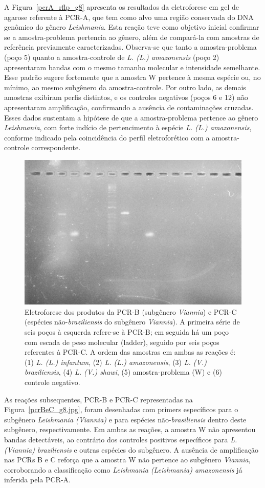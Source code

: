 A Figura~\ref{pcrA_rflp_g8} apresenta os resultados da eletroforese em gel de agarose referente à PCR-A, que tem como alvo uma região conservada do DNA genômico do gênero
 \textit{Leishmania}. Esta reação teve como objetivo inicial confirmar se a amostra-problema pertencia ao gênero, além de compará-la com amostras de referência previamente 
 caracterizadas. Observa-se que tanto a amostra-problema (poço 5) quanto a amostra-controle de \textit{L. (L.) amazonensis} (poço 2) apresentaram bandas com o mesmo tamanho 
 molecular e intensidade semelhante. Esse padrão sugere fortemente que a amostra W pertence à mesma espécie ou, no mínimo, ao mesmo subgênero da amostra-controle. Por outro 
 lado, as demais amostras  exibiram perfis distintos, e os controles negativos (poços 6 e 12) não apresentaram amplificação, confirmando a ausência de contaminações cruzadas.
Esses dados sustentam a hipótese de que a amostra-problema pertence ao gênero \textit{Leishmania}, com forte indício de pertencimento à espécie \textit{L. (L.) amazonensis}, 
conforme indicado pela coincidência do perfil eletroforético com a amostra-controle correspondente.

\begin{figure}
 \centering
 \includegraphics[width=.4\textwidth]{fig/pcrBeC_g8.jpg}
 \caption{Eletroforese dos produtos da PCR-B (subgênero \textit{Viannia}) e PCR-C (espécies não-\textit{braziliensis} do subgênero \textit{Viannia}). 
 A primeira série de seis poços à esquerda refere-se à PCR-B; em seguida há um poço com escada de peso molecular (ladder), seguido por seis poços referentes 
 à PCR-C. A ordem das amostras em ambas as reações é: (1) \textit{L. (L.) infantum}, (2) \textit{L. (L.) amazonensis}, (3) \textit{L. (V.) braziliensis}, 
 (4) \textit{L. (V.) shawi}, (5) amostra-problema (W) e (6) controle negativo.}
 \label{pcrBC}
 \end{figure}

As reações subsequentes, PCR-B e PCR-C representadas na Figura~\ref{pcrBeC_g8.jpg}, foram desenhadas com primers específicos para o subgênero \textit{Leishmania (Viannia)} e para espécies não-\textit{brasiliensis} dentro 
deste subgênero, respectivamente. Em ambas as reações, a amostra W não apresentou bandas detectáveis, ao contrário dos controles positivos específicos para \textit{L. (Viannia) 
braziliensis} e outras espécies do subgênero. A ausência de amplificação nas PCRs B e C reforça que a amostra W não pertence ao subgênero \textit{Viannia}, corroborando a classificação 
como \textit{Leishmania (Leishmania) amazonensis} já inferida pela PCR-A.

